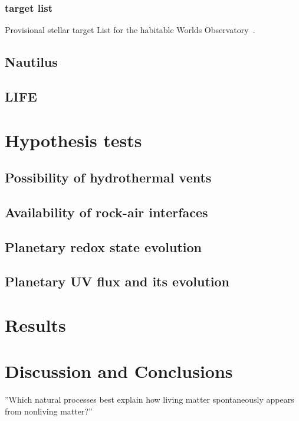 \documentclass[twocolumn]{aastex631}
\begin{document}
\subsubsection{target list}
Provisional stellar target List for the habitable Worlds Observatory~\citep{Mamajek2023}.

\subsection{Nautilus}
\subsection{LIFE} %

\section{Hypothesis tests}
\label{sec:hypotests}
\subsection{Possibility of hydrothermal vents}

\subsection{Availability of rock-air interfaces}

\subsection{Planetary redox state evolution}

\subsection{Planetary UV flux and its evolution}


\section{Results}
\label{sec:results}

\section{Discussion and Conclusions}
\label{sec:discussion}

''Which natural processes best explain how living matter spontaneously appears from nonliving matter?''~\citep{Malaterre2022}


\end{document}
